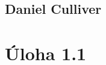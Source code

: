 \documentclass[12pt]{article}
\begin{document}
\subsection*{Daniel Culliver}
\section*{Úloha 1.1}
\end{document}
